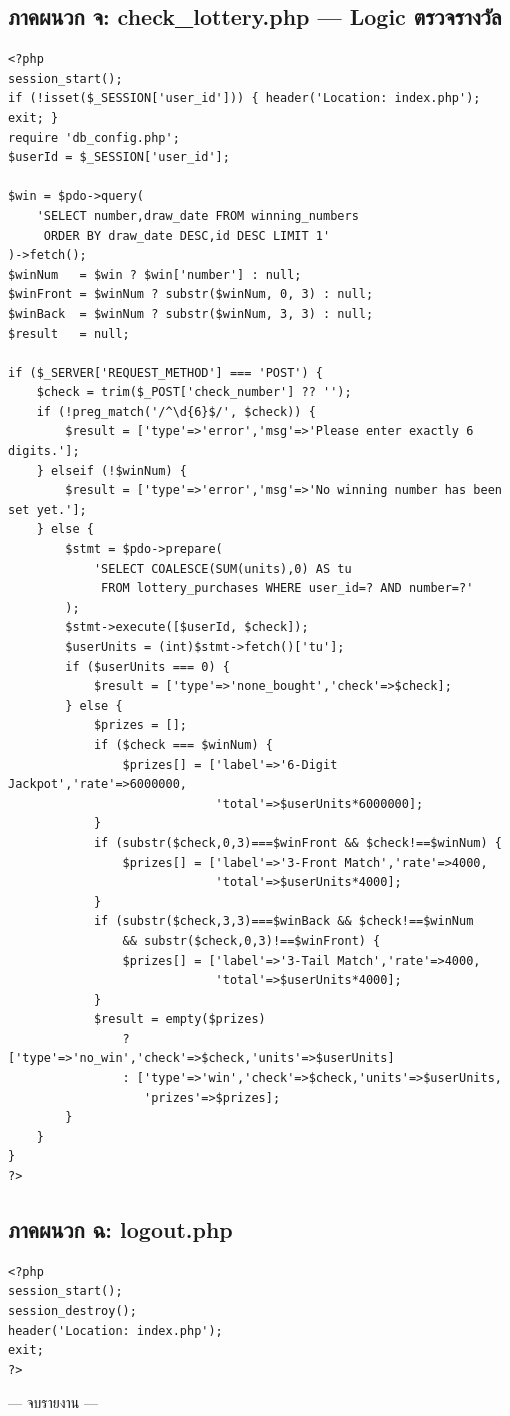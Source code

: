 \documentclass[a4paper,12pt]{article}
\begin{document}
\newpage

\subsection*{ภาคผนวก จ: check\_lottery.php --- Logic ตรวจรางวัล}

\begin{lstlisting}[style=phpstyle, caption={check\_lottery.php}]
<?php
session_start();
if (!isset($_SESSION['user_id'])) { header('Location: index.php'); exit; }
require 'db_config.php';
$userId = $_SESSION['user_id'];

$win = $pdo->query(
    'SELECT number,draw_date FROM winning_numbers
     ORDER BY draw_date DESC,id DESC LIMIT 1'
)->fetch();
$winNum   = $win ? $win['number'] : null;
$winFront = $winNum ? substr($winNum, 0, 3) : null;
$winBack  = $winNum ? substr($winNum, 3, 3) : null;
$result   = null;

if ($_SERVER['REQUEST_METHOD'] === 'POST') {
    $check = trim($_POST['check_number'] ?? '');
    if (!preg_match('/^\d{6}$/', $check)) {
        $result = ['type'=>'error','msg'=>'Please enter exactly 6 digits.'];
    } elseif (!$winNum) {
        $result = ['type'=>'error','msg'=>'No winning number has been set yet.'];
    } else {
        $stmt = $pdo->prepare(
            'SELECT COALESCE(SUM(units),0) AS tu
             FROM lottery_purchases WHERE user_id=? AND number=?'
        );
        $stmt->execute([$userId, $check]);
        $userUnits = (int)$stmt->fetch()['tu'];
        if ($userUnits === 0) {
            $result = ['type'=>'none_bought','check'=>$check];
        } else {
            $prizes = [];
            if ($check === $winNum) {
                $prizes[] = ['label'=>'6-Digit Jackpot','rate'=>6000000,
                             'total'=>$userUnits*6000000];
            }
            if (substr($check,0,3)===$winFront && $check!==$winNum) {
                $prizes[] = ['label'=>'3-Front Match','rate'=>4000,
                             'total'=>$userUnits*4000];
            }
            if (substr($check,3,3)===$winBack && $check!==$winNum
                && substr($check,0,3)!==$winFront) {
                $prizes[] = ['label'=>'3-Tail Match','rate'=>4000,
                             'total'=>$userUnits*4000];
            }
            $result = empty($prizes)
                ? ['type'=>'no_win','check'=>$check,'units'=>$userUnits]
                : ['type'=>'win','check'=>$check,'units'=>$userUnits,
                   'prizes'=>$prizes];
        }
    }
}
?>
\end{lstlisting}

\newpage

\subsection*{ภาคผนวก ฉ: logout.php}

\begin{lstlisting}[style=phpstyle, caption={logout.php}]
<?php
session_start();
session_destroy();
header('Location: index.php');
exit;
?>
\end{lstlisting}

\vspace{2em}
\begin{center}
--- จบรายงาน ---
\end{center}
\end{document}
